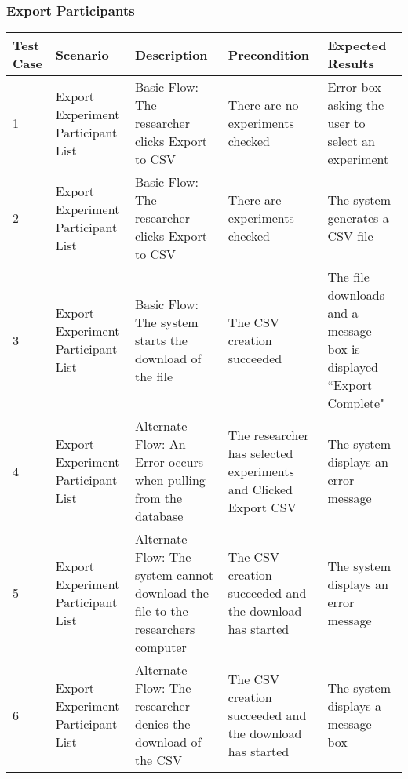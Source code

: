 \begin{landscape}
\subsubsection{Export Participants}
\begin{table}[!h]
    \begin{tabular}{|p{.6in}|p{1in}|p{2.5in}|p{2in}|p{2.5in}|}
        \hline
        Test Case & Scenario & Description & Precondition & Expected Results \\ \hline
        1 & Export Experiment Participant List & Basic Flow: The researcher clicks Export to CSV & There are no experiments checked & Error box asking the user to select an experiment \\ \hline
        2 & Export Experiment Participant List & Basic Flow: The researcher clicks Export to CSV & There are experiments checked & The system generates a CSV file \\ \hline
        3 & Export Experiment Participant List & Basic Flow: The system starts the download of the file & The CSV creation succeeded & The file downloads and a message box is displayed ``Export Complete" \\ \hline
        4 & Export Experiment Participant List & Alternate Flow: An Error occurs when pulling from the database & The researcher has selected experiments and Clicked Export CSV & The system displays an error message \\ \hline
        5 & Export Experiment Participant List & Alternate Flow: The system cannot download the file to the researchers computer & The CSV creation succeeded and the download has started & The system displays an error message \\ \hline
        6 & Export Experiment Participant List & Alternate Flow: The researcher denies the download of the CSV & The CSV creation succeeded and the download has started & The system displays a message box \\ \hline
    \end{tabular}
\end{table}
\end{landscape}